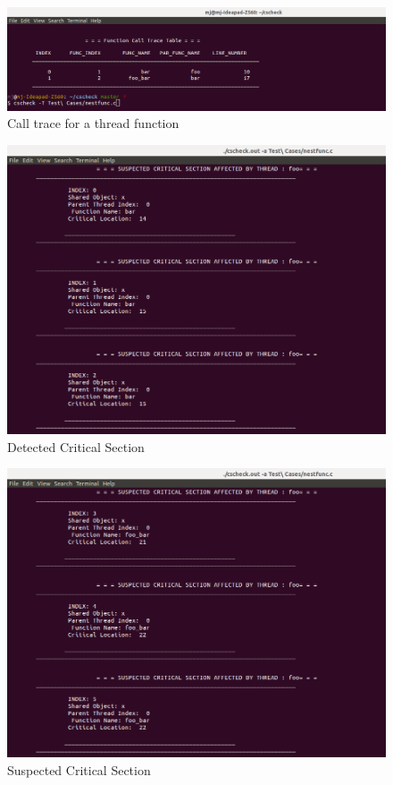\begin{figure}[H]
\centering
\includegraphics[scale=0.4]{Snaps/out1.png}
\caption{Call trace for a thread function}
\label{<<Label>>}
\end{figure}
\begin{figure}[H]
\centering
\includegraphics[scale=0.4]{Snaps/out2.png}
\caption{Detected Critical Section}
\label{<<Label>>}
\end{figure}
\begin{figure}[H]
\centering
\includegraphics[scale=0.4]{Snaps/out3.png}
\caption{Suspected Critical Section}
\label{<<Label>>}
\end{figure}

